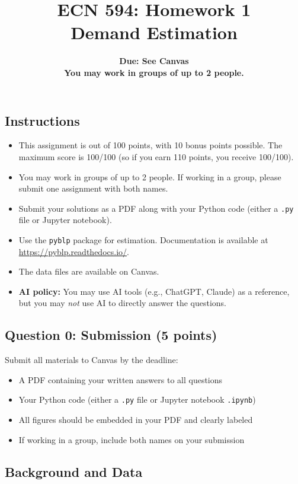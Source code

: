 \documentclass[11pt]{article}
\title{ECN 594: Homework 1 \\ \large{Demand Estimation}}
\author{\textbf{Due: See Canvas} \\
\textbf{You may work in groups of up to 2 people.}}
\date{}
\begin{document}
\maketitle

\subsection*{Instructions}
\begin{itemize}
\item This assignment is out of 100 points, with 10 bonus points possible. The maximum score is 100/100 (so if you earn 110 points, you receive 100/100).
\item You may work in groups of up to 2 people. If working in a group, please submit one assignment with both names.
\item Submit your solutions as a PDF along with your Python code (either a \texttt{.py} file or Jupyter notebook).
\item Use the \texttt{pyblp} package for estimation. Documentation is available at \url{https://pyblp.readthedocs.io/}.
\item The data files are available on Canvas.
\item \textbf{AI policy:} You may use AI tools (e.g., ChatGPT, Claude) as a reference, but you may \textit{not} use AI to directly answer the questions. 
\end{itemize}

\subsection*{Question 0: Submission (5 points)}

Submit all materials to Canvas by the deadline:
\begin{itemize}
	\item A PDF containing your written answers to all questions
	\item Your Python code (either a \texttt{.py} file or Jupyter notebook \texttt{.ipynb})
	\item All figures should be embedded in your PDF and clearly labeled
	\item If working in a group, include both names on your submission
\end{itemize}

\subsection*{Background and Data}
\end{document}
